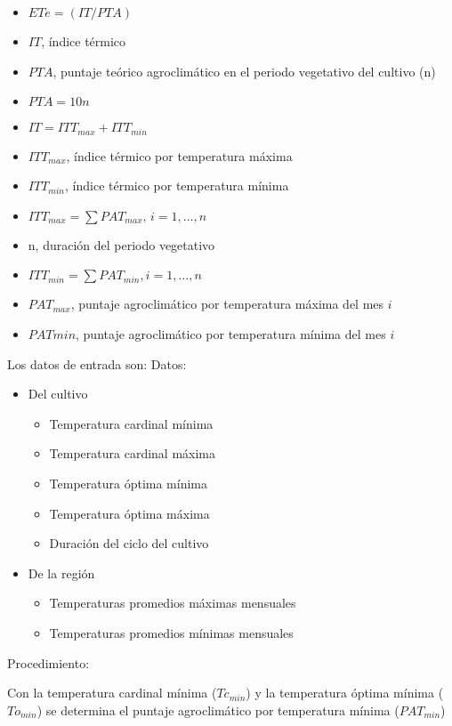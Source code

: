 \begin{notation}
\begin{itemize}
    \item $ETe =(IT/PTA)$
    \item $IT$, índice térmico
    \item $PTA$, puntaje teórico agroclimático en el periodo
    vegetativo del cultivo (n)
    \item $PTA = 10n$
    \item $IT = ITT_{max} +ITT_{min}$
    \item $ITT_{max}$, índice térmico por temperatura máxima
    \item $ITT_{min}$, índice térmico por temperatura mínima
    \item $ITT_{max} = \sum PAT_{max},\, i=1,\dots, n$
    \item n, duración del periodo vegetativo
    \item $ITT_{min} = \sum PAT_{min}, i=1,\dots, n$
    \item $PAT_{max}$, puntaje agroclimático por
    temperatura máxima del mes $i$
    \item $PATmin$, puntaje agroclimático por
    temperatura mínima del mes $i$
\end{itemize}
\end{notation}
Los datos de entrada son: 
Datos:
\begin{itemize}
    \item Del cultivo\begin{itemize}
        \item Temperatura cardinal mínima
        \item Temperatura cardinal máxima
        \item Temperatura óptima mínima
        \item Temperatura óptima máxima
        \item Duración del ciclo del cultivo
    \end{itemize}
    \item De la región\begin{itemize}
        \item Temperaturas promedios máximas mensuales
        \item Temperaturas promedios mínimas mensuales 
    \end{itemize}
\end{itemize}

Procedimiento:

Con la temperatura cardinal mínima ($Tc_{min}$) y la temperatura óptima mínima ($To_{min}$) se determina el puntaje agroclimático por temperatura mínima ($PAT_{min}$)

